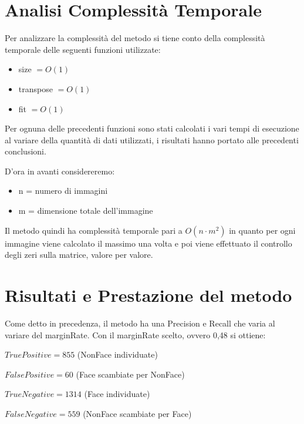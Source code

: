\documentclass[
  italian,
]{article}
\providecommand{\tightlist}{%
  \setlength{\itemsep}{0pt}\setlength{\parskip}{0pt}}
\begin{document}
\hypertarget{analisi-complessituxe0-temporale}{%
\section{Analisi Complessità
Temporale}\label{analisi-complessituxe0-temporale}}

Per analizzare la complessità del metodo si tiene conto della
complessità temporale delle seguenti funzioni utilizzate:

\begin{itemize}
\tightlist
\item
  size \(= O(1)\)
\item
  transpose \(= O(1)\)
\item
  fit \(= O(1)\)
\end{itemize}

Per ognuna delle precedenti funzioni sono stati calcolati i vari tempi
di esecuzione al variare della quantità di dati utilizzati, i risultati
hanno portato alle precedenti conclusioni.

D'ora in avanti considereremo:

\begin{itemize}
\tightlist
\item
  n = numero di immagini
\item
  m = dimensione totale dell'immagine
\end{itemize}

Il metodo quindi ha complessità temporale pari a \(O(n \cdot m^2)\) in
quanto per ogni immagine viene calcolato il massimo una volta e poi
viene effettuato il controllo degli zeri sulla matrice, valore per
valore.

\hypertarget{risultati-e-prestazione-del-metodo}{%
\section{Risultati e Prestazione del
metodo}\label{risultati-e-prestazione-del-metodo}}

Come detto in precedenza, il metodo ha una Precision e Recall che varia al variare del marginRate.
Con il marginRate scelto, ovvero 0,48 si ottiene:

\(True Positive = 855\) (NonFace individuate)

\(False Positive = 60\) (Face scambiate per NonFace)

\(True Negative = 1314\) (Face individuate)

\(False Negative = 559\) (NonFace scambiate per Face)
\end{document}
